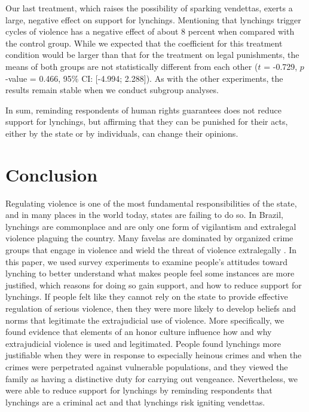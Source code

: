 \documentclass[12pt,ansiapaper]{article}
\begin{document}
Our last treatment, which raises the possibility of sparking vendettas, exerts a large, negative effect on support for lynchings. Mentioning that lynchings trigger cycles of violence has a negative effect of about 8 percent when compared with the control group. While we expected that the coefficient for this treatment condition would be larger than that for the treatment on legal punishments, the means of both groups are not statistically different from each other ($t$ = -0.729, $p$-value = 0.466, 95\% CI: [-4.994; 2.288]). As with the other experiments, the results remain stable when we conduct subgroup analyses. 

In sum, reminding respondents of human rights guarantees does not reduce support for lynchings, but affirming that they can be punished for their acts, either by the state or by individuals, can change their opinions.

\section{Conclusion}
\label{conclusion}

Regulating violence is one of the most fundamental responsibilities of the state, and in many places in the world today, states are failing to do so. In Brazil, lynchings are commonplace and are only one form of vigilantism and extralegal violence plaguing the country. Many favelas are dominated by organized crime groups that engage in violence and wield the threat of violence extralegally \citep{arias2006dynamics,barnes2017criminal}. In this paper, we used survey experiments to examine people's attitudes toward lynching to better understand what makes people feel some instances are more justified, which reasons for doing so gain support, and how to reduce support for lynchings. If people felt like they cannot rely on the state to provide effective regulation of serious violence, then they were more likely to develop beliefs and norms that legitimate the extrajudicial use of violence. More specifically, we found evidence that elements of an honor culture influence how and why extrajudicial violence is used and legitimated. People found lynchings more justifiable when they were in response to especially heinous crimes and when the crimes were perpetrated against vulnerable populations, and they viewed the family as having a distinctive duty for carrying out vengeance. Nevertheless, we were able to reduce support for lynchings by reminding respondents that lynchings are a criminal act and that lynchings risk igniting vendettas. 
\end{document}
